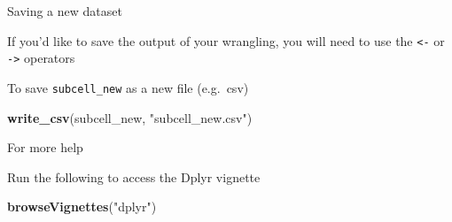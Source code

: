 \documentclass[ignorenonframetext,]{beamer}
\newenvironment{Shaded}{\begin{snugshade}}{\end{snugshade}}
\newcommand{\KeywordTok}[1]{\textcolor[rgb]{0.13,0.29,0.53}{\textbf{#1}}}
\newcommand{\NormalTok}[1]{#1}
\newcommand{\OperatorTok}[1]{\textcolor[rgb]{0.81,0.36,0.00}{\textbf{#1}}}
\newcommand{\StringTok}[1]{\textcolor[rgb]{0.31,0.60,0.02}{#1}}
\begin{document}
\begin{frame}[fragile]{Saving a new dataset}
\protect\hypertarget{saving-a-new-dataset}{}

If you'd like to save the output of your wrangling, you will need to use
the \texttt{\textless{}-} or \texttt{-\textgreater{}} operators

\begin{Shaded}
\end{Shaded}

To save \texttt{subcell\_new} as a new file (e.g.~csv)

\begin{Shaded}
\begin{Highlighting}[]
\KeywordTok{write_csv}\NormalTok{(subcell_new, }\StringTok{"subcell_new.csv"}\NormalTok{)}
\end{Highlighting}
\end{Shaded}

\end{frame}

\begin{frame}[fragile]{For more help}
\protect\hypertarget{for-more-help}{}

Run the following to access the Dplyr vignette

\begin{Shaded}
\begin{Highlighting}[]
\KeywordTok{browseVignettes}\NormalTok{(}\StringTok{"dplyr"}\NormalTok{)}
\end{Highlighting}
\end{Shaded}

\end{frame}
\end{document}
